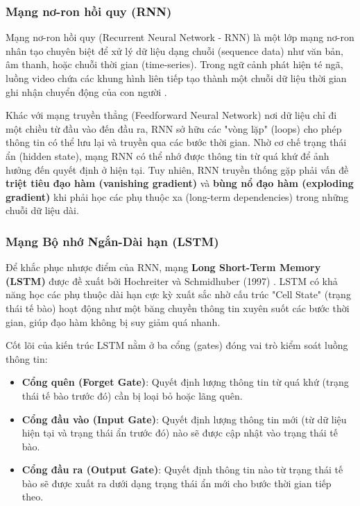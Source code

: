 \subsubsection{Mạng nơ-ron hồi quy (RNN)}

Mạng nơ-ron hồi quy (Recurrent Neural Network - RNN) là một lớp mạng nơ-ron nhân tạo chuyên biệt để xử lý dữ liệu dạng chuỗi (sequence data) như văn bản, âm thanh, hoặc chuỗi thời gian (time-series). Trong ngữ cảnh phát hiện té ngã, luồng video chứa các khung hình liên tiếp tạo thành một chuỗi dữ liệu thời gian ghi nhận chuyển động của con người
.

Khác với mạng truyền thẳng (Feedforward Neural Network) nơi dữ liệu chỉ đi một chiều từ đầu vào đến đầu ra, RNN sở hữu các "vòng lặp" (loops) cho phép thông tin có thể lưu lại và truyền qua các bước thời gian.
Nhờ cơ chế trạng thái ẩn (hidden state), mạng RNN có thể nhớ được thông tin từ quá khứ để ảnh hưởng đến quyết định ở hiện tại. Tuy nhiên, RNN truyền thống gặp phải vấn đề \textbf{triệt tiêu đạo hàm (vanishing gradient)} và \textbf{bùng nổ đạo hàm (exploding gradient)} khi phải học các phụ thuộc xa (long-term dependencies) trong những chuỗi dữ liệu dài.

\subsubsection{Mạng Bộ nhớ Ngắn-Dài hạn (LSTM)}

Để khắc phục nhược điểm của RNN, mạng \textbf{Long Short-Term Memory (LSTM)} được đề xuất bởi Hochreiter và Schmidhuber (1997)
. LSTM có khả năng học các phụ thuộc dài hạn cực kỳ xuất sắc nhờ cấu trúc "Cell State" (trạng thái tế bào) hoạt động như một băng chuyền thông tin xuyên suốt các bước thời gian, giúp đạo hàm không bị suy giảm quá nhanh.

Cốt lõi của kiến trúc LSTM nằm ở ba cổng (gates) đóng vai trò kiểm soát luồng thông tin:
\begin{itemize}
    \item \textbf{Cổng quên (Forget Gate)}: Quyết định lượng thông tin từ quá khứ (trạng thái tế bào trước đó) cần bị loại bỏ hoặc lãng quên.
    \item \textbf{Cổng đầu vào (Input Gate)}: Quyết định lượng thông tin mới (từ dữ liệu hiện tại và trạng thái ẩn trước đó) nào sẽ được cập nhật vào trạng thái tế bào.
    \item \textbf{Cổng đầu ra (Output Gate)}: Quyết định thông tin nào từ trạng thái tế bào sẽ được xuất ra dưới dạng trạng thái ẩn mới cho bước thời gian tiếp theo.
\end{itemize}

